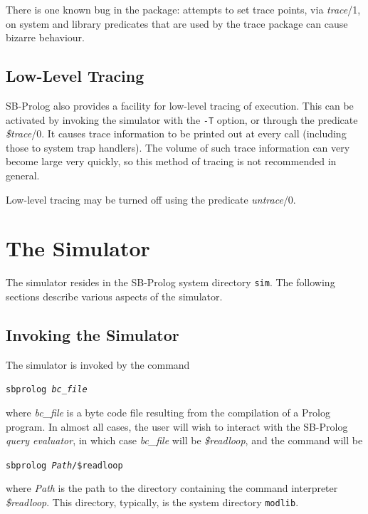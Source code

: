 There is one known bug in the package: attempts to set trace points,
via {\em trace}/1, on system and library predicates that are used by the trace
package can cause bizarre behaviour.

\subsection{Low-Level Tracing}
 

SB-Prolog also provides a facility for low-level tracing of execution.
This can be activated by invoking the simulator with the {\tt -T} option,
or through the predicate {\em \$trace}/0.
It causes trace information to be printed out at every
call (including those to system trap handlers).
The volume of such trace information can very become large very quickly,
so this method of tracing is not recommended in general.

Low-level tracing may be turned off using the predicate {\em untrace}/0.

\section{The Simulator}

The simulator resides in the SB-Prolog system directory {\tt sim}.
The following sections describe various aspects of the simulator.

\subsection{Invoking the Simulator}

The simulator is invoked by the command
\begin{center}
{\tt sbprolog {\em bc\_\/file}}
\end{center}
where {\em bc\_\/file} is a byte code file
resulting from the compilation of a Prolog program.
In almost all cases, the user will wish to interact with the SB-Prolog
{\em query evaluator},
in which case {\em bc\_file} will be {\em \$readloop}, and the command will be
\begin{center}
{\tt sbprolog {\em Path}/\$readloop}
\end{center}
where {\em Path} is the path to the directory containing the
command interpreter {\em \$readloop}.
This directory, typically, is the system directory {\tt modlib}.

